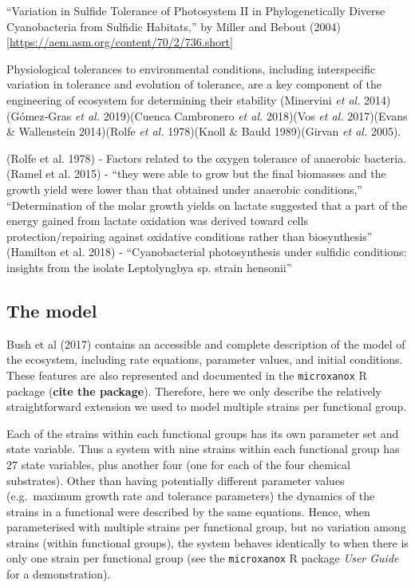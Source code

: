 \documentclass{article}
\begin{document}
``Variation in Sulfide Tolerance of Photosystem II in Phylogenetically
Diverse Cyanobacteria from Sulfidic Habitats,'' by Miller and Bebout
(2004) {[}\url{https://aem.asm.org/content/70/2/736.short}{]}

Physiological tolerances to environmental conditions, including
interspecific variation in tolerance and evolution of tolerance, are a
key component of the engineering of ecosystem for determining their
stability (Minervini \emph{et al.} 2014)(Gómez‐Gras \emph{et al.}
2019)(Cuenca Cambronero \emph{et al.} 2018)(Vos \emph{et al.}
2017)(Evans \& Wallenstein 2014)(Rolfe \emph{et al.} 1978)(Knoll \&
Bauld 1989)(Girvan \emph{et al.} 2005).

(Rolfe et al. 1978) - Factors related to the oxygen tolerance of
anaerobic bacteria. (Ramel et al. 2015) - ``they were able to grow but
the final biomasses and the growth yield were lower than that obtained
under anaerobic conditions,'' ``Determination of the molar growth yields
on lactate suggested that a part of the energy gained from lactate
oxidation was derived toward cells protection/repairing against
oxidative conditions rather than biosynthesis'' (Hamilton et al. 2018) -
``Cyanobacterial photosynthesis under sulfidic conditions: insights from
the isolate Leptolyngbya sp. strain hensonii''

\hypertarget{the-model}{%
\subsection{The model}\label{the-model}}

Bush et al (2017) contains an accessible and complete description of the
model of the ecosystem, including rate equations, parameter values, and
initial conditions. These features are also represented and documented
in the \texttt{microxanox} R package (\textbf{cite the package}).
Therefore, here we only describe the relatively straightforward
extension we used to model multiple strains per functional group.

Each of the strains within each functional groups has its own parameter
set and state variable. Thus a system with nine strains within each
functional group has 27 state variables, plus another four (one for each
of the four chemical substrates). Other than having potentially
different parameter values (e.g.~maximum growth rate and tolerance
parameters) the dynamics of the strains in a functional were described
by the same equations. Hence, when parameterised with multiple strains
per functional group, but no variation among strains (within functional
groups), the system behaves identically to when there is only one strain
per functional group (see the \texttt{microxanox} R package \emph{User
Guide} for a demonstration).
\end{document}
